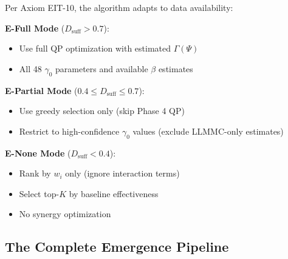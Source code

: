 \begin{tcolorbox}[colback=yellow!5!white, colframe=yellow!75!black,
    title=\textbf{EMERGE Adaptation by Data Mode}]

Per Axiom EIT-10, the algorithm adapts to data availability:

\textbf{E-Full Mode} ($D_{\text{suff}} > 0.7$):
\begin{itemize}[nosep]
    \item Use full QP optimization with estimated $\Gamma(\Psi)$
    \item All 48 $\gamma_0$ parameters and available $\beta$ estimates
\end{itemize}

\textbf{E-Partial Mode} ($0.4 \leq D_{\text{suff}} \leq 0.7$):
\begin{itemize}[nosep]
    \item Use greedy selection only (skip Phase 4 QP)
    \item Restrict to high-confidence $\gamma_0$ values (exclude LLMMC-only estimates)
\end{itemize}

\textbf{E-None Mode} ($D_{\text{suff}} < 0.4$):
\begin{itemize}[nosep]
    \item Rank by $w_i$ only (ignore interaction terms)
    \item Select top-$K$ by baseline effectiveness
    \item No synergy optimization
\end{itemize}

\end{tcolorbox}

\subsection{The Complete Emergence Pipeline}
\label{subsec:complete-pipeline}

